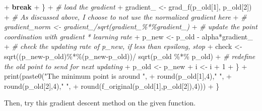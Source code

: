 \documentclass[
]{article}
\newenvironment{Shaded}{\begin{snugshade}}{\end{snugshade}}
\newcommand{\CommentTok}[1]{\textcolor[rgb]{0.56,0.35,0.01}{\textit{#1}}}
\newcommand{\ControlFlowTok}[1]{\textcolor[rgb]{0.13,0.29,0.53}{\textbf{#1}}}
\newcommand{\DecValTok}[1]{\textcolor[rgb]{0.00,0.00,0.81}{#1}}
\newcommand{\FunctionTok}[1]{\textcolor[rgb]{0.00,0.00,0.00}{#1}}
\newcommand{\NormalTok}[1]{#1}
\newcommand{\OtherTok}[1]{\textcolor[rgb]{0.56,0.35,0.01}{#1}}
\newcommand{\SpecialCharTok}[1]{\textcolor[rgb]{0.00,0.00,0.00}{#1}}
\newcommand{\StringTok}[1]{\textcolor[rgb]{0.31,0.60,0.02}{#1}}
\begin{document}
\begin{Shaded}
\begin{Highlighting}[]
\SpecialCharTok{+}       \ControlFlowTok{break}
\SpecialCharTok{+}\NormalTok{       \}}
\SpecialCharTok{+}     \CommentTok{\# load the gradient}
\SpecialCharTok{+}\NormalTok{     gradient\_ }\OtherTok{\textless{}{-}} \FunctionTok{grad\_f}\NormalTok{(p\_old[}\DecValTok{1}\NormalTok{], p\_old[}\DecValTok{2}\NormalTok{])}
\SpecialCharTok{+}     \CommentTok{\# As discussed above, I choose to not use the normalized gradient here}
\SpecialCharTok{+}     \CommentTok{\# gradient\_norm \textless{}{-} gradient\_/sqrt(gradient\_\%*\%gradient\_)}
\SpecialCharTok{+}     \CommentTok{\# update the point coordination with gradient * learning rate}
\SpecialCharTok{+}\NormalTok{     p\_new }\OtherTok{\textless{}{-}}\NormalTok{ p\_old }\SpecialCharTok{{-}}\NormalTok{ alpha}\SpecialCharTok{*}\NormalTok{gradient\_}
\SpecialCharTok{+}     \CommentTok{\# check the updating rate of p\_new, if less than epsilong, stop}
\SpecialCharTok{+}\NormalTok{     check }\OtherTok{\textless{}{-}} \FunctionTok{sqrt}\NormalTok{((p\_new}\SpecialCharTok{{-}}\NormalTok{p\_old)}\SpecialCharTok{\%*\%}\NormalTok{(p\_new}\SpecialCharTok{{-}}\NormalTok{p\_old))}\SpecialCharTok{/} \FunctionTok{sqrt}\NormalTok{(p\_old }\SpecialCharTok{\%*\%}\NormalTok{ p\_old)}
\SpecialCharTok{+}     \CommentTok{\# redefine the old point to send for next updating }
\SpecialCharTok{+}\NormalTok{     p\_old }\OtherTok{\textless{}{-}}\NormalTok{ p\_new}
\SpecialCharTok{+}\NormalTok{     i }\OtherTok{\textless{}{-}}\NormalTok{ i }\SpecialCharTok{+} \DecValTok{1}
\SpecialCharTok{+}\NormalTok{   \}}
\SpecialCharTok{+}   \FunctionTok{print}\NormalTok{(}\FunctionTok{paste0}\NormalTok{(}\StringTok{"The minimum point is around "}\NormalTok{, }
\SpecialCharTok{+}                \FunctionTok{round}\NormalTok{(p\_old[}\DecValTok{1}\NormalTok{],}\DecValTok{4}\NormalTok{),}\StringTok{" "}\NormalTok{,}
\SpecialCharTok{+}                \FunctionTok{round}\NormalTok{(p\_old[}\DecValTok{2}\NormalTok{],}\DecValTok{4}\NormalTok{),}\StringTok{" "}\NormalTok{,}
\SpecialCharTok{+}                \FunctionTok{round}\NormalTok{(}\FunctionTok{f\_original}\NormalTok{(p\_old[}\DecValTok{1}\NormalTok{],p\_old[}\DecValTok{2}\NormalTok{]),}\DecValTok{4}\NormalTok{)))}
\SpecialCharTok{+}\NormalTok{ \}}
\end{Highlighting}
\end{Shaded}

Then, try this gradient descent method on the given function.
\end{document}
